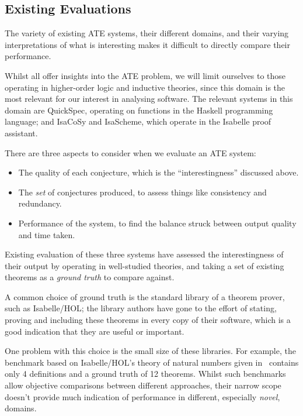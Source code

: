 \subsection{Existing Evaluations}
\label{sec:existing}

The variety of existing ATE systems, their different domains, and their varying
interpretations of what is interesting makes it difficult to directly compare
their performance.

Whilst all offer insights into the ATE problem, we will limit ourselves to those
operating in higher-order logic and inductive theories, since this domain is the
most relevant for our interest in analysing software. The relevant systems in
this domain are QuickSpec, operating on functions in the Haskell programming
language; and IsaCoSy and IsaScheme, which operate in the Isabelle proof
assistant.

There are three aspects to consider when we evaluate an ATE system:

\begin{itemize}
\item The quality of each conjecture, which is the ``interestingness'' discussed
  above.
\item The \emph{set} of conjectures produced, to assess things like consistency
  and redundancy.
\item Performance of the system, to find the balance struck between output
  quality and time taken.
\end{itemize}

Existing evaluation of these three systems have assessed the interestingness of
their output by operating in well-studied theories, and taking a set of existing
theorems as a \emph{ground truth} to compare against.

A common choice of ground truth is the standard library of a theorem prover,
such as Isabelle/HOL; the library authors have gone to the effort of stating,
proving and including these theorems in every copy of their software, which is a
good indication that they are useful or important.

One problem with this choice is the small size of these libraries. For example,
the benchmark based on Isabelle/HOL's theory of natural numbers given
in~\cite{Johansson.Dixon.Bundy:conjecture-generation} contains only 4
definitions and a ground truth of 12 theorems. Whilst such benchmarks allow
objective comparisons between different approaches, their narrow scope doesn't
provide much indication of performance in different, especially \emph{novel}, domains.

